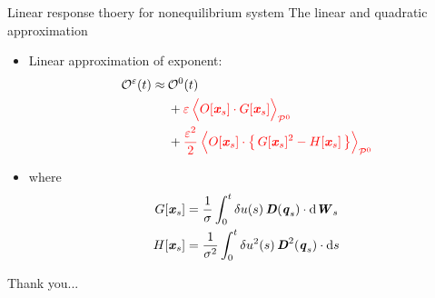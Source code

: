 \documentclass[fleqn]{beamer}
\newcommand{\redc}[1]{{\color{red} #1}}
\newcommand{\bluec}[1]{{\color{blue} #1}}
\newcommand{\vect}[1]{\textbf{\textit{#1}}}
\newcommand{\dd}[0]{\textrm{d}}
\newcommand{\fe}{u}
\newcommand{\eps}{\varepsilon}
\newcommand{\mo}{\mathcal O}
\newcommand{\pathmeas}{\mathcal P}
\begin{document}
\begin{frame}{Linear response thoery for nonequilibrium system}
  {The linear and quadratic approximation}
  \begin{itemize}
  \item<1-> Linear approximation of exponent:
    \bluec{
      \begin{align*}
        \mo^\eps(t) \approx\: & \mo^0(t)\\
        &+
        \redc{\eps\:
          \Big\langle
          O[\vect x_s]\cdot G[\vect x_s]
          \Big\rangle_{\pathmeas^0}}
        \\
        &+
        \redc{
        \frac{\eps^2}2\:
        \Big\langle
        O[\vect x_s]\cdot \big\{\, G[\vect x_s]^2 - H[\vect x_s]\,\big\}
        \Big\rangle_{\pathmeas^0}}
      \end{align*}
    }
  \item<2-> where
    \bluec{
      \begin{align*}
        G[\vect x_s] & = \frac 1\sigma\int_0^t\delta\fe(s)\,\vect D(\vect q_s)\cdot \dd\vect W_s\\
        H[\vect x_s] & = \frac 1{\sigma^2}\int_0^t\delta\fe^2(s)\,\vect D^2(\vect q_s)\cdot \dd s
    \end{align*}
    }
  \end{itemize}
\end{frame}












\begin{frame}
  Thank you...
\end{frame}
\end{document}
